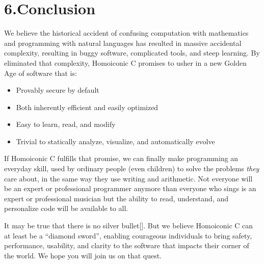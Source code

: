 \documentclass[preprint]{{sigplanconf}}
\begin{document}
\section{6.\hspace*{0.5em}Conclusion}\label{sec-conclusion}%

\noindent{}We believe the historical accident of confusing computation with mathematics
and programming with natural languages has resulted in massive accidental
complexity, resulting in buggy software, complicated tools, and steep learning.
By eliminated that complexity, Homoiconic C promises to usher in a new Golden Age of software that is:%

\begin{itemize}[noitemsep,topsep=\mdcompacttopsep]%

\item{}Provably secure by default%

\item{}Both inherently efficient and easily optimized%

\item{}Easy to learn, read, and modify%

\item{}Trivial to statically analyze, visualize, and automatically evolve%
\end{itemize}%

\noindent{}If Homoiconic C fulfills that promise, we can finally make programming an
everyday skill, used by ordinary people (even children) to solve the problems
\emph{they} care about, in the same way they use writing and arithmetic.  Not
everyone will be an expert or professional programmer \textendash{} anymore than everyone who sings is an expert or professional musician \textendash{} but the ability to
read, understand, and personalize code will be available to all.%

It may be true that there is no silver bullet[].   But we believe
Homoiconic C can at least be a \textquotedblleft{}diamond sword\textquotedblright{}, enabling courageous individuals
to bring safety, performance, usability, and clarity to the software that
impacts their corner of the world.  We hope you will join us on that quest.%
\end{document}
